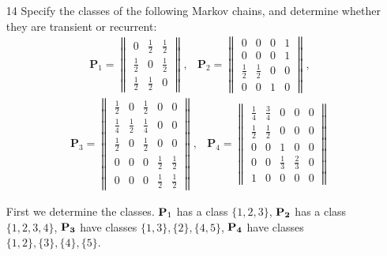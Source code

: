 \documentclass[en,hazy,blue,12pt,device = normal]{elegantnote}
\begin{document}
\begin{enumerate}
    \item[14] Specify the classes of the following Markov chains, and determine whether they are transient or recurrent:
    \begin{align*}
        &\mathbf{P}_1=\left\|\begin{array}{ccc}
        0 & \frac{1}{2} & \frac{1}{2} \\
        \frac{1}{2} & 0 & \frac{1}{2} \\
        \frac{1}{2} & \frac{1}{2} & 0
        \end{array}\right\|,
        &\mathbf{P}_2=\left\|\begin{array}{llll}
        0 & 0 & 0 & 1 \\
        0 & 0 & 0 & 1 \\
        \frac{1}{2} & \frac{1}{2} & 0 & 0 \\
        0 & 0 & 1 & 0
        \end{array}\right\|,
    \end{align*}
    \begin{align*}
        &\mathbf{P}_3=\left\|\begin{array}{lllll}
        \frac{1}{2} & 0 & \frac{1}{2} & 0 & 0 \\
        \frac{1}{4} & \frac{1}{2} & \frac{1}{4} & 0 & 0 \\
        \frac{1}{2} & 0 & \frac{1}{2} & 0 & 0 \\
        0 & 0 & 0 & \frac{1}{2} & \frac{1}{2} \\
        0 & 0 & 0 & \frac{1}{2} & \frac{1}{2}
        \end{array}\right\|,
        &\mathbf{P}_4=\left\|\begin{array}{ccccc}
        \frac{1}{4} & \frac{3}{4} & 0 & 0 & 0 \\
        \frac{1}{2} & \frac{1}{2} & 0 & 0 & 0 \\
        0 & 0 & 1 & 0 & 0 \\
        0 & 0 & \frac{1}{3} & \frac{2}{3} & 0 \\
        1 & 0 & 0 & 0 & 0
        \end{array}\right\|
    \end{align*}
    \begin{tcolorbox}
        \sol

        First we determine the classes. \({\bf P} _1\) has a class \(\{1,2,3\}\), \({\bf P_2}\) has a class \(\{1,2,3,4\}\), \({\bf P_3}\) have classes \(\{1,3\},\{2\},\{4,5\}\), \({\bf P_4}\) have classes \(\{1,2\},\{3\},\{4\},\{5\}\). 
        

\end{tcolorbox}
\end{enumerate}
\end{document}

